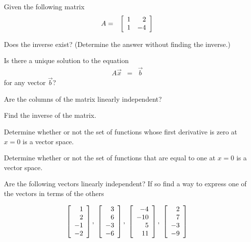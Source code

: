   \begin{problem}
  \item Given the following matrix
    \begin{eqnarray*}
      A & = & \left[ \begin{array}{rr} 1 & 2 \\ 1 & -4 \end{array} \right]
    \end{eqnarray*}
    \begin{subproblem}
      \item Does the inverse exist? (Determine the answer without
        finding the inverse.)
        \vfill
      \item Is there a unique solution to the equation
        \begin{eqnarray*}
          A \vec{x} & = & \vec{b}
        \end{eqnarray*}
        for any vector $\vec{b}$?
        \vfill
      \item Are the columns of the matrix linearly independent?
        \vfill
    \end{subproblem}

    \clearpage
  \item Find the inverse of the matrix.

        \vfill
        
  \end{problem}


  \begin{problem}

    \item Determine whether or not the set of functions whose first
      derivative is zero at $x=0$ is a vector space.
      \vfill

    \item Determine whether or not the set of functions that are equal
      to one at $x=0$ is a vector space.
      \vfill

      \clearpage

  \item Are the following vectors linearly independent? If so find a
    way to express one of the vectors in terms of the others

    \begin{eqnarray*}
      \left[ \begin{array}{r} 1 \\ 2 \\ -1 \\ -2 \end{array} \right],~\left[ \begin{array}{r} 3 \\ 6 \\ -3 \\ -6 \end{array} \right],~\left[ \begin{array}{r} -4 \\ -10 \\ 5 \\ 11 \end{array} \right],
      ~\left[ \begin{array}{r} 2 \\ 7 \\ -3 \\ -9 \end{array} \right]
    \end{eqnarray*}


\end{problem}
